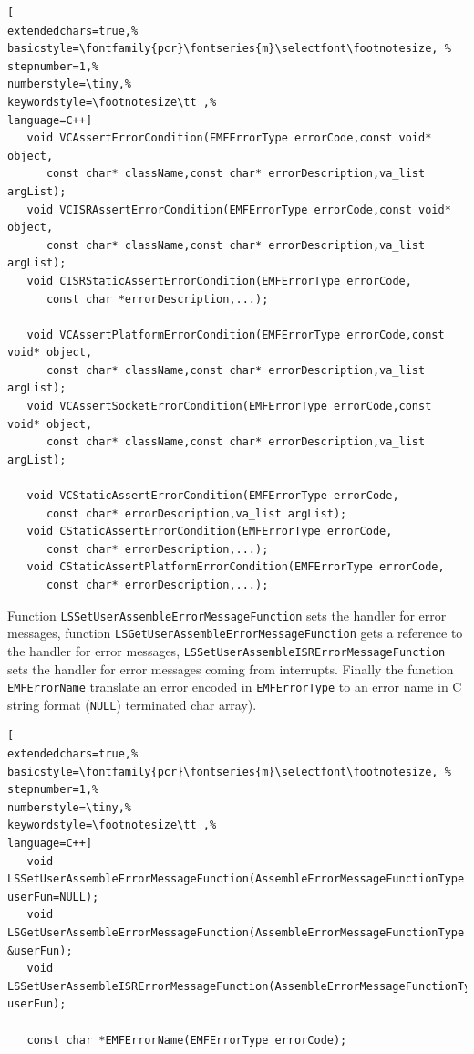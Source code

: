 \begin{lstlisting}[
extendedchars=true,%
basicstyle=\fontfamily{pcr}\fontseries{m}\selectfont\footnotesize, %
stepnumber=1,%
numberstyle=\tiny,%
keywordstyle=\footnotesize\tt ,%
language=C++]
   void VCAssertErrorCondition(EMFErrorType errorCode,const void* object,
      const char* className,const char* errorDescription,va_list argList);
   void VCISRAssertErrorCondition(EMFErrorType errorCode,const void* object,
      const char* className,const char* errorDescription,va_list argList);
   void CISRStaticAssertErrorCondition(EMFErrorType errorCode,
      const char *errorDescription,...);

   void VCAssertPlatformErrorCondition(EMFErrorType errorCode,const void* object,
      const char* className,const char* errorDescription,va_list argList);
   void VCAssertSocketErrorCondition(EMFErrorType errorCode,const void* object,
      const char* className,const char* errorDescription,va_list argList);

   void VCStaticAssertErrorCondition(EMFErrorType errorCode,
      const char* errorDescription,va_list argList);
   void CStaticAssertErrorCondition(EMFErrorType errorCode,
      const char* errorDescription,...);
   void CStaticAssertPlatformErrorCondition(EMFErrorType errorCode,
      const char* errorDescription,...);
\end{lstlisting}

Function \texttt{LSSetUserAssembleErrorMessageFunction} sets the handler for error messages, function \texttt{LSGetUserAssembleErrorMessageFunction} gets a reference to the handler for error messages, \texttt{LSSetUserAssembleISRErrorMessageFunction} sets the handler for error messages coming from interrupts. Finally the function \texttt{EMFErrorName} translate an error encoded in \texttt{EMFErrorType} to an error name in C string format (\texttt{NULL}) terminated char array).

\begin{lstlisting}[
extendedchars=true,%
basicstyle=\fontfamily{pcr}\fontseries{m}\selectfont\footnotesize, %
stepnumber=1,%
numberstyle=\tiny,%
keywordstyle=\footnotesize\tt ,%
language=C++]
   void LSSetUserAssembleErrorMessageFunction(AssembleErrorMessageFunctionType userFun=NULL);
   void LSGetUserAssembleErrorMessageFunction(AssembleErrorMessageFunctionType &userFun);
   void LSSetUserAssembleISRErrorMessageFunction(AssembleErrorMessageFunctionType userFun);

   const char *EMFErrorName(EMFErrorType errorCode);
\end{lstlisting}



